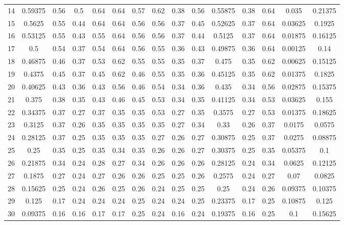 \begin{table}[!h]
{{\begin{tabular}{l||c|c|c|c|c|c|c|c|c||c|c|c||c|c}
 	 14 & 0.59375 & 0.56 & 0.5 & 0.64 & 0.64 & 0.57 & 0.62 & 0.38 & 0.56  &  0.55875 & 0.38 & 0.64  &  0.035 & 0.21375\\
 	 15 & 0.5625 & 0.55 & 0.44 & 0.64 & 0.64 & 0.56 & 0.56 & 0.37 & 0.45  &  0.52625 & 0.37 & 0.64  &  0.03625 & 0.1925\\
 	 16 & 0.53125 & 0.55 & 0.43 & 0.55 & 0.64 & 0.56 & 0.56 & 0.37 & 0.44  &  0.5125 & 0.37 & 0.64  &  0.01875 & 0.16125\\
 	 17 & 0.5 & 0.54 & 0.37 & 0.54 & 0.64 & 0.56 & 0.55 & 0.36 & 0.43  &  0.49875 & 0.36 & 0.64  &  0.00125 & 0.14\\
 	 18 & 0.46875 & 0.46 & 0.37 & 0.53 & 0.62 & 0.55 & 0.55 & 0.35 & 0.37  &  0.475 & 0.35 & 0.62  &  0.00625 & 0.15125\\
 	 19 & 0.4375 & 0.45 & 0.37 & 0.45 & 0.62 & 0.46 & 0.55 & 0.35 & 0.36  &  0.45125 & 0.35 & 0.62  &  0.01375 & 0.1825\\
 	 20 & 0.40625 & 0.43 & 0.36 & 0.43 & 0.56 & 0.46 & 0.54 & 0.34 & 0.36  &  0.435 & 0.34 & 0.56  &  0.02875 & 0.15375\\
 	 21 & 0.375 & 0.38 & 0.35 & 0.43 & 0.46 & 0.45 & 0.53 & 0.34 & 0.35  &  0.41125 & 0.34 & 0.53  &  0.03625 & 0.155\\
 	 22 & 0.34375 & 0.37 & 0.27 & 0.37 & 0.35 & 0.35 & 0.53 & 0.27 & 0.35  &  0.3575 & 0.27 & 0.53  &  0.01375 & 0.18625\\
 	 23 & 0.3125 & 0.37 & 0.26 & 0.35 & 0.35 & 0.35 & 0.35 & 0.27 & 0.34  &  0.33 & 0.26 & 0.37  &  0.0175 & 0.0575\\
 	 24 & 0.28125 & 0.37 & 0.25 & 0.35 & 0.35 & 0.35 & 0.27 & 0.26 & 0.27  &  0.30875 & 0.25 & 0.37  &  0.0275 & 0.08875\\
 	 25 & 0.25 & 0.35 & 0.25 & 0.35 & 0.34 & 0.35 & 0.26 & 0.26 & 0.27  &  0.30375 & 0.25 & 0.35  &  0.05375 & 0.1\\
 	 26 & 0.21875 & 0.34 & 0.24 & 0.28 & 0.27 & 0.34 & 0.26 & 0.26 & 0.26  &  0.28125 & 0.24 & 0.34  &  0.0625 & 0.12125\\
 	 27 & 0.1875 & 0.27 & 0.24 & 0.27 & 0.26 & 0.26 & 0.25 & 0.25 & 0.26  &  0.2575 & 0.24 & 0.27  &  0.07 & 0.0825\\
 	 28 & 0.15625 & 0.25 & 0.24 & 0.26 & 0.25 & 0.26 & 0.24 & 0.25 & 0.25  &  0.25 & 0.24 & 0.26  &  0.09375 & 0.10375\\
 	 29 & 0.125 & 0.17 & 0.24 & 0.24 & 0.24 & 0.25 & 0.24 & 0.24 & 0.25  &  0.23375 & 0.17 & 0.25  &  0.10875 & 0.125\\
 	 30 & 0.09375 & 0.16 & 0.16 & 0.17 & 0.17 & 0.25 & 0.24 & 0.16 & 0.24  &  0.19375 & 0.16 & 0.25  &  0.1 & 0.15625\\

\end{tabular}}}
\end{table}
